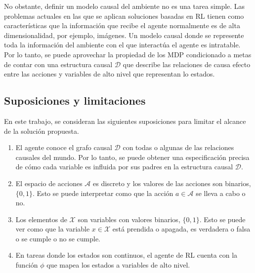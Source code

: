 No obstante, definir un modelo causal del ambiente no es una tarea simple.
Las problemas actuales en las que se aplican soluciones 
basadas en RL tienen como características que la información
que recibe el agente normalmente es de alta dimensionalidad, por 
ejemplo, imágenes. Un modelo causal donde se represente toda
la información del ambiente con el que interactúa el agente
es intratable. 
Por lo tanto, se puede aprovechar la propiedad de los MDP condicionado a metas de contar con una
estructura causal $\mathcal{D}$ que describe las relaciones de causa efecto entre las acciones 
y variables de alto nivel que representan lo estados.


\subsection{Suposiciones y limitaciones}

En este trabajo, se consideran  las siguientes suposiciones para limitar el alcance de la solución propuesta.

\begin{enumerate}
    \item El agente conoce el grafo causal $\mathcal{D}$ con todas o
    algunas de las relaciones causales del mundo.
    Por lo tanto,
se puede obtener una especificación precisa de cómo cada variable es influida por sus padres
en la estructura causal $\mathcal{D}$.
    \item El espacio de acciones $\mathcal{A}$ es discreto y los valores de las acciones son binarios, $\{0, 1\}$. Esto se puede interpretar como que la acción $a \in \mathcal{A}$ se lleva a cabo o no.
    \item Los elementos de $\mathcal{X}$ son variables con valores binarios, $\{0,1\}$. Esto se puede ver como que la variable $x\in \mathcal{X}$
    está prendida o apagada, es verdadera o falsa o se cumple o no se cumple.
    \item En tareas donde los estados son continuos, el agente de RL cuenta con la función $\phi$ que mapea los estados a variables de alto nivel.
\end{enumerate}


